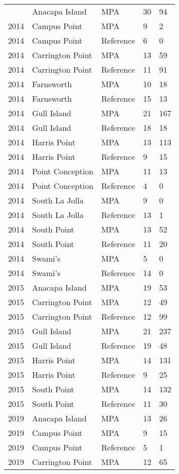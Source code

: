 \documentclass[11pt,
  english,
  letterpaper,
]{article}
\begin{document}
\begin{longtable}[t]{l>{\raggedright\arraybackslash}p{3cm}lll}
\endfoot
\bottomrule
\endlastfoot
2014 & Anacapa Island & MPA & 30 & 94\\
2014 & Campus Point & MPA & 9 & 2\\
2014 & Campus Point & Reference & 6 & 0\\
2014 & Carrington Point & MPA & 13 & 59\\
2014 & Carrington Point & Reference & 11 & 91\\
2014 & Farnsworth & MPA & 10 & 18\\
2014 & Farnsworth & Reference & 15 & 13\\
2014 & Gull Island & MPA & 21 & 167\\
2014 & Gull Island & Reference & 18 & 18\\
2014 & Harris Point & MPA & 13 & 113\\
2014 & Harris Point & Reference & 9 & 15\\
2014 & Point Conception & MPA & 11 & 13\\
2014 & Point Conception & Reference & 4 & 0\\
2014 & South La Jolla & MPA & 9 & 0\\
2014 & South La Jolla & Reference & 13 & 1\\
2014 & South Point & MPA & 13 & 52\\
2014 & South Point & Reference & 11 & 20\\
2014 & Swami's & MPA & 5 & 0\\
2014 & Swami's & Reference & 14 & 0\\
2015 & Anacapa Island & MPA & 19 & 53\\
2015 & Carrington Point & MPA & 12 & 49\\
2015 & Carrington Point & Reference & 12 & 99\\
2015 & Gull Island & MPA & 21 & 237\\
2015 & Gull Island & Reference & 19 & 48\\
2015 & Harris Point & MPA & 14 & 131\\
2015 & Harris Point & Reference & 9 & 25\\
2015 & South Point & MPA & 14 & 132\\
2015 & South Point & Reference & 11 & 30\\
2019 & Anacapa Island & MPA & 13 & 26\\
2019 & Campus Point & MPA & 9 & 15\\
2019 & Campus Point & Reference & 5 & 1\\
2019 & Carrington Point & MPA & 12 & 65\\

\end{longtable}
\end{document}
